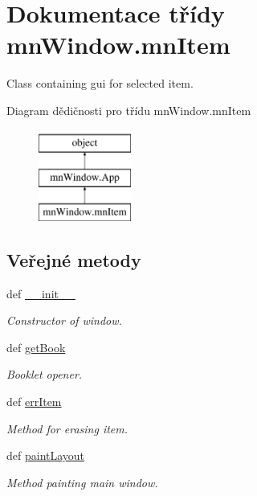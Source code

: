 \hypertarget{classmnWindow_1_1mnItem}{\section{Dokumentace třídy mn\-Window.\-mn\-Item}
\label{classmnWindow_1_1mnItem}
}


Class containing gui for selected item.  


Diagram dědičnosti pro třídu mn\-Window.\-mn\-Item\begin{figure}[H]
\begin{center}
\leavevmode
\includegraphics[height=3.000000cm]{db/dee/classmnWindow_1_1mnItem}
\end{center}
\end{figure}
\subsection*{Veřejné metody}
\begin{DoxyCompactItemize}
\item 
def \hyperlink{classmnWindow_1_1mnItem_af01fc782be86642d4108ef8bd83fdf75}{\-\_\-\-\_\-init\-\_\-\-\_\-}
\begin{DoxyCompactList}\small\item\em Constructor of window. \end{DoxyCompactList}\item 
def \hyperlink{classmnWindow_1_1mnItem_a9af6ba5f9bdfd604cf8e415fcb2ccf7f}{get\-Book}
\begin{DoxyCompactList}\small\item\em Booklet opener. \end{DoxyCompactList}\item 
def \hyperlink{classmnWindow_1_1mnItem_ae53c84d4ee29e3dc504b144224179aef}{err\-Item}
\begin{DoxyCompactList}\small\item\em Method for erasing item. \end{DoxyCompactList}\item 
def \hyperlink{classmnWindow_1_1mnItem_aa3d189e9da59ad27dcde5fba34f4fe8f}{paint\-Layout}
\begin{DoxyCompactList}\small\item\em Method painting main window. \end{DoxyCompactList}\end{DoxyCompactItemize}
